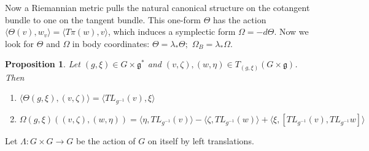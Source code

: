 \documentclass{article}
\newtheorem{prop}{Proposition}
\begin{document}
Now a Riemannian metric pulls the natural canonical structure on the cotangent bundle to one on the tangent bundle. This one-form $\Theta$ has the action $ \langle \Theta(v), w_v \rangle = \langle T\pi(w), v \rangle$, which induces a symplectic form $\Omega = - d\Theta$. Now we look for $\Theta$ and $\Omega$ in body coordinates: $\Theta = \lambda_*\Theta; \hspace{4pt} \Omega_B = \lambda_*\Omega$.

\begin{prop}

Let $(g,\xi) \in G \times \mathfrak{g}^*$ and $(v,\zeta),(w,\eta) \in T_{(g,\xi)}(G \times \mathfrak{g})$. Then 
\begin{enumerate}
    \item $\langle \Theta(g,\xi), (v,\zeta) \rangle = \langle TL_{g^{-1}}(v), \xi \rangle$
    \item $\Omega(g,\xi)((v,\zeta),(w,\eta)) = \langle \eta, TL_{g^{-1}}(v) \rangle - \langle \zeta, TL_{g^{-1}}(w) \rangle + \langle \xi, [TL_{g^{-1}}(v), TL_{g^{-1}}w] \rangle $
\end{enumerate}

\end{prop}

Let $\Lambda: G \times G \to G$ be the action of $G$ on itself by left translations.
\end{document}
